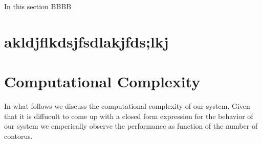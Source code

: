 \appendices

In this section BBBB


\section{akldjflkdsjfsdlakjfds;lkj}

\section{Computational Complexity}

In what follows we discuss the computational complexity of our system. Given that it is diffucult to come up with a closed form expression for the behavior of our system we emperically observe the performance as function of the number of contorus. 


